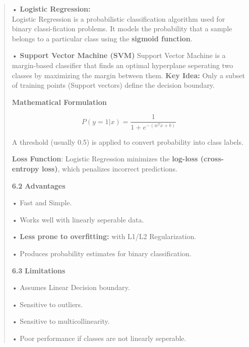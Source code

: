 \documentclass[
]{article}
\begin{document}
\begin{quote}
• \textbf{Logistic Regression:}\\
Logistic Regression is a probabilistic classification algorithm used for
binary classi-fication problems. It models the probability that a sample
belongs to a particular class using the \textbf{sigmoid function}.

• \textbf{Support Vector Machine (SVM)} Support Vector Machine is a
margin-based classifier that finds an optimal hyperplane seperating two
classes by maximizing the margin between them. \textbf{Key Idea:} Only a
subset of training points (Support vectors) define the decision
boundary.

\textbf{Mathematical Formulation}

\[P(y = 1|x) = \frac{1}{1 + e^{-(w^T x + b)}}\]

A threshold (usually 0.5) is applied to convert probability into class
labels.

\textbf{Loss Function}: Logistic Regression minimizes the
\textbf{log-loss (cross-entropy loss)}, which penalizes incorrect
predictions.

\textbf{6.2} \textbf{Advantages}

• Fast and Simple.

• Works well with linearly seperable data.

• \textbf{Less prone to overfitting:} with L1/L2 Regularization.

• Produces probability estimates for binary classification.

\textbf{6.3} \textbf{Limitations}

• Assumes Linear Decision boundary.

• Sensitive to outliers.

• Sensitive to multicollinearity.

• Poor performance if classes are not linearly seperable.
\end{quote}
\end{document}
